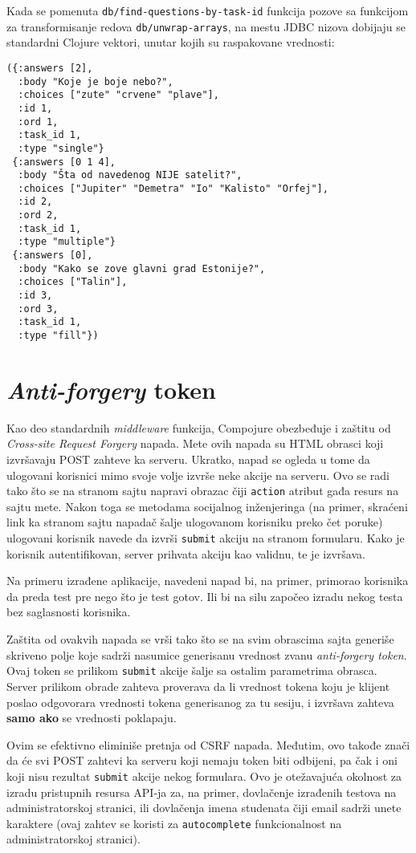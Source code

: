 {Kada se pomenuta \texttt{db/find-questions-by-task-id} funkcija pozove sa funkcijom za transformisanje redova \texttt{db/unwrap-arrays}, na mestu JDBC nizova dobijaju se standardni Clojure vektori, unutar kojih su raspakovane vrednosti:
\begin{verbatim}
({:answers [2],
  :body "Koje je boje nebo?",
  :choices ["zute" "crvene" "plave"],
  :id 1,
  :ord 1,
  :task_id 1,
  :type "single"}
 {:answers [0 1 4],
  :body "Šta od navedenog NIJE satelit?",
  :choices ["Jupiter" "Demetra" "Io" "Kalisto" "Orfej"],
  :id 2,
  :ord 2,
  :task_id 1,
  :type "multiple"}
 {:answers [0],
  :body "Kako se zove glavni grad Estonije?",
  :choices ["Talin"],
  :id 3,
  :ord 3,
  :task_id 1,
  :type "fill"})
\end{verbatim}

\section{\textit{Anti-forgery} token}
Kao deo standardnih \textit{middleware} funkcija, Compojure obezbeđuje i zaštitu od \textit{Cross-site Request Forgery} napada. Mete ovih napada su HTML obrasci koji izvršavaju POST zahteve ka serveru. Ukratko, napad se ogleda u tome da ulogovani korisnici mimo svoje volje izvrše neke akcije na serveru. Ovo se radi tako što se na stranom sajtu napravi obrazac čiji \texttt{action} atribut gađa resurs na sajtu mete. Nakon toga se metodama socijalnog inženjeringa (na primer, skraćeni link ka stranom sajtu napadač šalje ulogovanom korisniku preko čet poruke) ulogovani korisnik navede da izvrši \texttt{submit} akciju na stranom formularu. Kako je korisnik autentifikovan, server prihvata akciju kao validnu, te je izvršava.

Na primeru izrađene aplikacije, navedeni napad bi, na primer, primorao korisnika da preda test pre nego što je test gotov. Ili bi na silu započeo izradu nekog testa bez saglasnosti korisnika.

Zaštita od ovakvih napada se vrši tako što se na svim obrascima sajta generiše skriveno polje koje sadrži nasumice generisanu vrednost zvanu \textit{anti-forgery token}. Ovaj token se prilikom \texttt{submit} akcije šalje sa ostalim parametrima obrasca. Server prilikom obrade zahteva proverava da li vrednost tokena koju je klijent poslao odgovorara vrednosti tokena generisanog za tu sesiju, i izvršava zahteva \textbf{samo ako} se vrednosti poklapaju.


Ovim se efektivno eliminiše pretnja od CSRF napada. Međutim, ovo takođe znači da će svi POST zahtevi ka serveru koji nemaju token biti odbijeni, pa čak i oni koji nisu rezultat \texttt{submit} akcije nekog formulara. Ovo je otežavajuća okolnost za izradu pristupnih resursa API-ja za, na primer, dovlačenje izrađenih testova na administratorskoj stranici, ili dovlačenja imena studenata čiji email sadrži unete karaktere (ovaj zahtev se koristi za \texttt{autocomplete} funkcionalnost na administratorskoj stranici).

}

